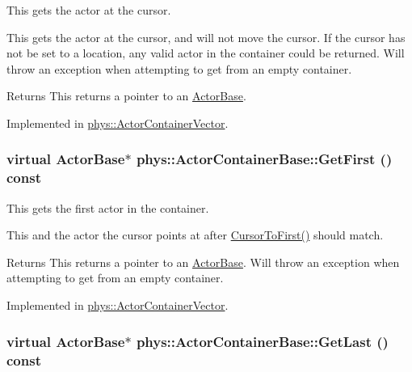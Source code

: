 This gets the actor at the cursor. 

This gets the actor at the cursor, and will not move the cursor. If the cursor has not be set to a location, any valid actor in the container could be returned. Will throw an exception when attempting to get from an empty container. \begin{DoxyReturn}{Returns}
This returns a pointer to an \hyperlink{classphys_1_1ActorBase}{ActorBase}. 
\end{DoxyReturn}


Implemented in \hyperlink{classphys_1_1ActorContainerVector_a280700490b368a963dd8feae044c7a6d}{phys::ActorContainerVector}.

\hypertarget{classphys_1_1ActorContainerBase_ae703482d84a9c6726e28a8f26418b161}{
\subsubsection[{GetFirst}]{\setlength{\rightskip}{0pt plus 5cm}virtual {\bf ActorBase}$\ast$ phys::ActorContainerBase::GetFirst () const}}
\label{d1/d00/classphys_1_1ActorContainerBase_ae703482d84a9c6726e28a8f26418b161}


This gets the first actor in the container. 

This and the actor the cursor points at after \hyperlink{classphys_1_1ActorContainerBase_ab1a44758d7c17e70ff2e0f8de47424c3}{CursorToFirst()} should match. \begin{DoxyReturn}{Returns}
This returns a pointer to an \hyperlink{classphys_1_1ActorBase}{ActorBase}. Will throw an exception when attempting to get from an empty container. 
\end{DoxyReturn}


Implemented in \hyperlink{classphys_1_1ActorContainerVector_a55ceecd017455f3185aa62798811e3c6}{phys::ActorContainerVector}.

\hypertarget{classphys_1_1ActorContainerBase_a8efeffd5ae22085fe01af791b3ea559e}{
\subsubsection[{GetLast}]{\setlength{\rightskip}{0pt plus 5cm}virtual {\bf ActorBase}$\ast$ phys::ActorContainerBase::GetLast () const}}
\label{d1/d00/classphys_1_1ActorContainerBase_a8efeffd5ae22085fe01af791b3ea559e}


